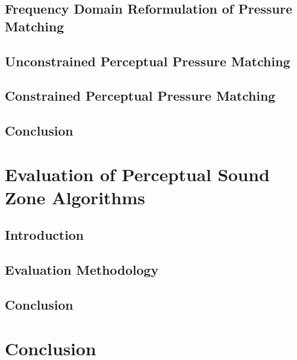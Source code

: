 \documentclass[10pt,twoside,openright,titlepage]{ce}
\begin{document}
\section{Frequency Domain Reformulation of Pressure Matching}
\label{ch:perceptual_sound_zone:frequency_domain}

\newpage
\section{Unconstrained Perceptual Pressure Matching}
\label{ch:perceptual_sound_zone:perceptual_minimization}

\newpage
\section{Constrained Perceptual Pressure Matching}
\label{ch:perceptual_sound_zone:perceptual_constraining}

\newpage
\section{Conclusion}
\label{ch:perceptual_sound_zone:conclusion}


\chapter{Evaluation of Perceptual Sound Zone Algorithms}
\label{ch:results}
\section{Introduction}
\label{ch:results:introduction}

\newpage
\section{Evaluation Methodology}

\newpage
\section{Conclusion}
\label{ch:results:conclusion}


\chapter{Conclusion}




\appendix
\end{document}
